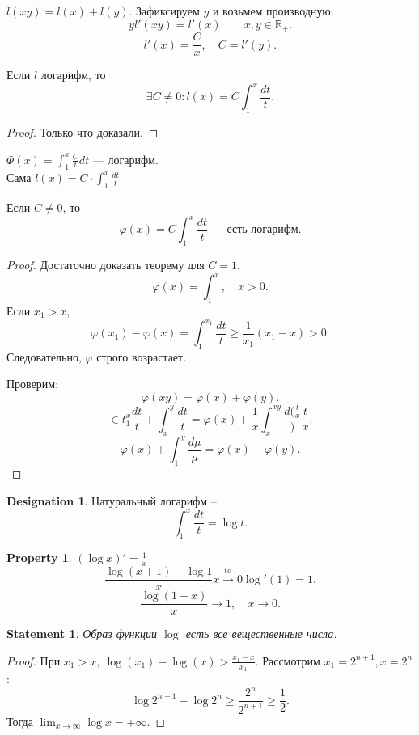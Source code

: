 \documentclass[11pt]{book}
\newcommand{\R}{\mathbb{R}}
\renewcommand{\ge}{\geqslant}
\theoremstyle{definition}
\theoremstyle{plain}
\theoremstyle{plain}
\newtheorem*{st}{Statement}
\newtheorem*{prop}{Property}
\theoremstyle{definition}
\newtheorem*{name}{Designation}
\theoremstyle{remark}
\begin{document}
\begin{thm}$ $

    $ l(xy) = l(x) + l(y)$.
    Зафиксируем $ y$ и возьмем производную:
    \[
	y l'(xy) = l'(x) \qquad x, y \in  \R_{+}
    .\]
    \[
	l'(x) = \frac{C}{x}, \quad C = l'(y)
    .\]
\end{thm}
\begin{thm}
    Если $ l$ логарифм, то \[
	\exists  C \ne 0 : l(x) = C \int_1 ^{x} \frac{dt}{t}
    .\]
\end{thm}
\begin{proof}
    Только что доказали.
\end{proof}
\begin{thm}
    $ \Phi(x) = \int_1^{x} \frac{C}{t}dt$ --- логарифм.\\
    Сама $ l (x) = C \cdot \int_1^{x} \frac{dt}{t}$
\end{thm}
\begin{thm}
    Если $ C \ne 0$, то \[
	\varphi (x) = C\int_1 ^{x} \frac{dt}{t} \text{ --- есть логарифм}
    .\]
\end{thm}
\begin{proof}
    Достаточно доказать теорему для $ C=1$.
    \[
	\varphi (x) = \int_1^{x} ,\quad x>0
    .\]
    Если $ x_1>x$,
    \[
	\varphi (x_1) - \varphi (x) = \int_1^{x_1} \frac{dt}{t} \ge  \frac{1}{x_1} (x_1-x) > 0
    .\]
    Следовательно, $  \varphi $ строго возрастает.

    Проверим:
    \[
	\varphi (xy) = \varphi (x) + \varphi (y)
    .\]
    \[
	\in t_1 ^{x} \frac{dt}{t} +\int_x ^{y} \frac{dt}{t} = \varphi  (x) + \frac{1}{x} \int_x ^{xy} \frac{d(\frac{t}{x}}){\frac{t}{x}}
    .\]
    \[
	\varphi (x) + \int_1 ^{y} \frac{d \mu}{\mu} = \varphi (x) - \varphi (y)
    .\]
\end{proof}
\begin{name}
    Натуральный логарифм --
    \[
	\int_1^{x} \frac{dt}{t} = \log t
    .\]
\end{name}
\begin{prop}
    $ (\log x)' = \frac{1}{x}$
    \[
	\frac{\log (x+1) - \log 1}{x} \stackrel{to} {x \to  0} \log'(1) = 1
    .\]
    \[
	\frac{\log(1+x)}{x} \to 1, \quad x \to  0
    .\]
\end{prop}
\begin{st}
    Образ функции $ \log$ есть все вещественные числа.
\end{st}
\begin{proof}
    При $ x_1>x, ~ \log(x_1) - \log(x) > \frac{x_1-x}{x_1}$.
    Рассмотрим $ x_1 = 2^{n+1}, x = 2^{n}$ :
    \[
	\log 2 ^{n+1} - \log 2^{n} \ge  \frac{2^{n}}{2^{n+1}} \ge \frac{1}{2}
    .\]
    Тогда $ \lim_{x \to  \infty} \log x = + \infty$.
\end{proof}
\end{document}
